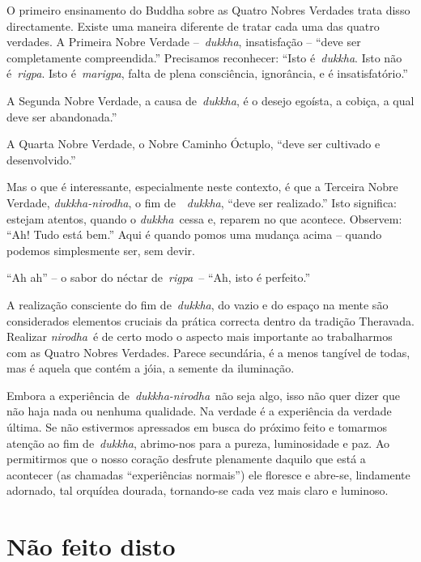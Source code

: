 O primeiro ensinamento do Buddha sobre as Quatro Nobres Verdades trata
disso directamente. Existe uma maneira diferente de tratar cada uma das
quatro verdades. A Primeira Nobre Verdade --~\emph{dukkha}, insatisfação
-- ``deve ser completamente compreendida.'' Precisamos reconhecer:
``Isto é~\emph{dukkha}. Isto não é~\emph{rigpa}. Isto é~\emph{marigpa},
falta de plena consciência, ignorância, e é insatisfatório.''

A Segunda Nobre Verdade, a causa de~\emph{dukkha}, é o desejo egoísta, a
cobiça, a qual deve ser abandonada.''

A Quarta Nobre Verdade, o Nobre Caminho Óctuplo, ``deve ser cultivado e
desenvolvido.''

Mas o que é interessante, especialmente neste contexto, é que a Terceira
Nobre Verdade, \emph{dukkha-nirodha}, o fim de~~\emph{dukkha}, ``deve
ser realizado.'' Isto significa: estejam atentos, quando o
\emph{dukkha}~cessa e, reparem no que acontece. Observem: ``Ah! Tudo
está bem.'' Aqui é quando pomos uma mudança acima -- quando podemos
simplesmente ser, sem devir.

``Ah ah'' -- o sabor do néctar de~\emph{rigpa}~-- ``Ah, isto é
perfeito.''

A realização consciente do fim de~\emph{dukkha}, do vazio e do espaço na
mente são considerados elementos cruciais da prática correcta dentro da
tradição Theravada. Realizar \emph{nirodha}~é de certo modo o aspecto
mais importante ao trabalharmos com as Quatro Nobres Verdades. Parece
secundária, é a menos tangível de todas, mas é aquela que contém a jóia,
a semente da iluminação.

Embora a experiência de~\emph{dukkha-nirodha}~não seja algo, isso não
quer dizer que não haja nada ou nenhuma qualidade. Na verdade é a
experiência da verdade última. Se não estivermos apressados em busca do
próximo feito e tomarmos atenção ao fim de~\emph{dukkha}, abrimo-nos
para a pureza, luminosidade e paz. Ao permitirmos que o nosso coração
desfrute plenamente daquilo que está a acontecer (as chamadas
``experiências normais'') ele floresce e abre-se, lindamente adornado,
tal orquídea dourada, tornando-se cada vez mais claro e luminoso.

\section{Não feito disto}

